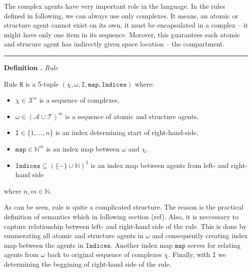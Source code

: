 \documentclass[12pt]{fithesis2}
\newcounter{counter}[section]
\renewcommand{\thecounter}{\thesection.\arabic{counter}}
\newenvironment{definition}[1]{\bigskip\refstepcounter{counter}\noindent\textbf{Definition \thecounter } \textit{#1} \par\nopagebreak}{\bigskip}
\begin{document}
The complex agents have very important role in the language. In the rules defined in following, we can always use only complexes. It means, an atomic or structure agent cannot exist on its own, it must be encapsulated in a complex -- it might have only one item in its sequence. Morover, this guarantees each atomic and strucure agent has indirectly given space location -- the compartment.

\noindent\rule{\textwidth}{1pt}

\begin{definition}{Rule}

Rule $\mathtt{R}$ is a 5-tuple $(\chi, \omega, \mathtt{I}, \mathtt{map}, \mathtt{Indices})$ where:

\begin{itemize}
\item $\chi \in \mathcal{X}^n$ is a sequence of complexes,
\item $\omega \in (\mathcal{A} \cup \mathcal{T})^m$ is a sequence of atomic and structure agents,
\item $\mathtt{I} \in \{ 1, \ldots, n \}$ is an index determining start of right-hand-side,
\item $\mathtt{map} \in \mathbb{N}^m$ is an index map between $\omega$ and $\chi$,
\item $\mathtt{Indices} \subseteq (\{-\} \cup \mathbb{N})^2$ is an index map between agents from left- and right-hand side
\end{itemize}

where $n, m \in \mathbb{N}$.
\end{definition}

As can be seen, rule is quite a complicated structure. The reason is the practical definition of semantics which in following section (ref). Also, it is neccessary to capture relationship between left- and right-hand side of the rule. This is done by enumerating all atomic and structure agents in $\omega$ and consequently creating index map between the agents in $\mathtt{Indices}$. Another index map $\mathtt{map}$ serves for relating agents from $\omega$ back to original sequence of complexes $\chi$. Finally, with $\mathtt{I}$ we determining the beggining of right-hand side of the rule.
\end{document}
